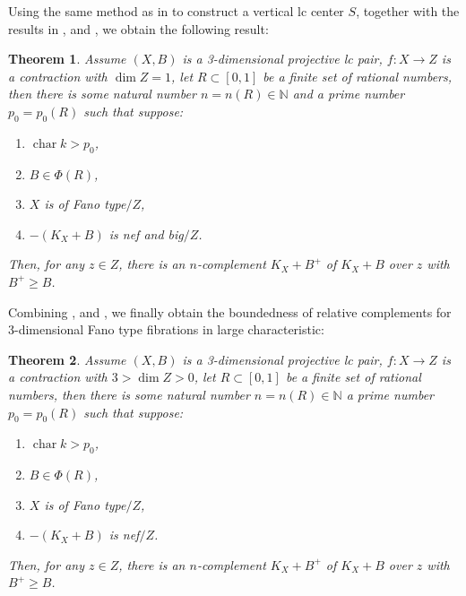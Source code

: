 \documentclass[letterpaper,reqno,12pt]{amsart}
\DeclareMathOperator{\chara}{char}
\numberwithin{equation}{section}
\theoremstyle{plain}
\newtheorem{theorem}{Theorem}[section]
\begin{document}
Using the same method as in  to construct a vertical lc center $S$, together with the results in ,  and , we obtain the following result:
\begin{theorem}
\label{relacomp6}
    Assume $(X,B)$ is a 3-dimensional projective lc pair, $f:X\to Z$ is a contraction with $\dim Z=1$, let $R\subset [0,1]$ be a finite set of rational numbers, then there is some natural number $n=n(R)\in\mathbb N$ and a prime number $p_0=p_0(R)$ such that suppose:
    \begin{enumerate}
        \item $\chara k>p_0$,
        \item $B\in\Phi(R)$,
        \item $X$ is of Fano type$/Z$,
        \item $-(K_X+B)$ is nef and big$/Z$.
    \end{enumerate}
    Then, for any $z\in Z$, there is an $n$-complement $K_X+B^+$ of $K_X+B$ over $z$ with $B^+\geq B$.
\end{theorem}
Combining ,  and , we finally obtain the boundedness of relative complements for 3-dimensional Fano type fibrations in large characteristic:
\begin{theorem}\label{recomp}
    Assume $(X,B)$ is a 3-dimensional projective lc pair, $f:X\to Z$ is a contraction with $3>\dim Z>0$, let $R\subset [0,1]$ be a finite set of rational numbers, then there is some natural number $n=n(R)\in\mathbb N$ a prime number $p_0=p_0(R)$ such that suppose:
    \begin{enumerate}
        \item $\chara k>p_0$,
        \item $B\in\Phi(R)$,
        \item $X$ is of Fano type$/Z$,
        \item $-(K_X+B)$ is nef$/Z$.
    \end{enumerate}
    Then, for any $z\in Z$, there is an $n$-complement $K_X+B^+$ of $K_X+B$ over $z$ with $B^+\geq B$.
\end{theorem}



\end{document}
